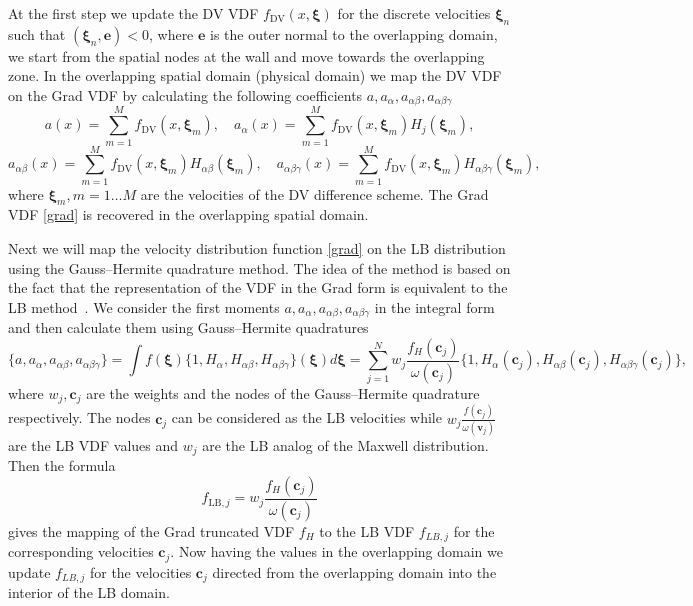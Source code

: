 \documentclass[]{elsarticle} %
\newcommand{\bxi}{\boldsymbol{\xi}}
\newcommand{\bv}{\boldsymbol{v}}
\newcommand{\bc}{\boldsymbol{c}}
\begin{document}
At the first step we update the DV VDF $f_\mathrm{DV}(x,\bxi)$ for the discrete velocities $\bxi_n$ such that $(\bxi_n,\mathbf{e})<0$, where $\mathbf{e}$ is the outer normal to the overlapping domain, we start from the  spatial nodes at the wall and move towards  the overlapping zone.
In the overlapping spatial domain (physical domain)  we map the DV VDF  on the Grad VDF by calculating the following coefficients $a, a_\alpha,a_{\alpha\beta}, a_{\alpha\beta \gamma}$
$$
a(x)=\sum_{m=1}^M f_\mathrm{DV}(x,\bxi_m),   \quad a_\alpha(x)=\sum_{m=1}^Mf_\mathrm{DV}(x,\bxi_m)H_j(\bxi_m),
$$
$$
a_{\alpha\beta }(x)=\sum_{m=1}^Mf_\mathrm{DV}(x,\bxi_m)H_{\alpha\beta}(\bxi_m), \quad
a_{\alpha\beta \gamma}(x)=\sum_{m=1}^Mf_\mathrm{DV}(x,\bxi_m)H_{\alpha\beta \gamma}(\bxi_m),
$$
where $\bxi_m, m=1 \ldots M$ are the velocities of the DV difference scheme.
The Grad VDF \eqref{grad} is recovered in the overlapping spatial domain.

Next we will map the velocity distribution function \eqref{grad} on the LB distribution using the Gauss--Hermite quadrature method.
The idea of the method is based on the fact that the representation of the VDF in the Grad form
is equivalent to the LB method~\cite{He1997, Shan1998, Shan2006}.
We consider the first moments $a,a_{\alpha},a_{\alpha\beta}, a_{\alpha\beta \gamma}$ in the integral form and then calculate them using Gauss--Hermite quadratures
$$
\{ a,a_{\alpha},a_{\alpha\beta}, a_{\alpha\beta \gamma} \}=\int f(\bxi)\{1,H_{\alpha}, H_{\alpha\beta} ,H_{\alpha\beta \gamma}\}(\bxi)d\bxi=\sum_{j=1}^N w_j\frac{f_H(\boldsymbol{c}_j)}{\omega(\bc_j)}
\{1,H_{\alpha}(\bc_j),H_{\alpha\beta}(\bc_j), H_{\alpha\beta\gamma}(\bc_j) \},
$$
where $w_j, \boldsymbol{c}_j$ are the weights and the nodes of the Gauss--Hermite quadrature respectively. The nodes $\bc_j$ can be considered as the LB velocities while $ w_j\frac{f(\bc_j)}{\omega(\bv_j)}$ are the LB VDF values and
$w_j$ are the LB analog of the Maxwell distribution.  Then the formula
\begin{equation}\label{grad_to_latt}
f_{\mathrm{LB},j}= w_j\frac{f_H(\bc_j)}{\omega(\bc_j)}
\end{equation}
gives the mapping of the Grad truncated VDF $f_H$ to the LB VDF $f_{LB,j}$ for the corresponding velocities $\bc_j$. Now having the values in the overlapping domain we update $f_{LB,j}$ for the velocities $\bc_j$ directed from the overlapping domain into the interior of the LB domain.
\end{document}
